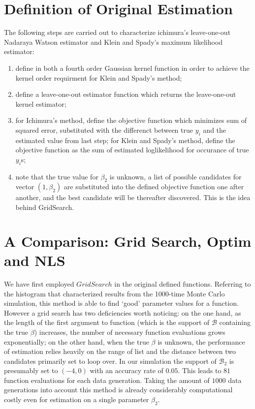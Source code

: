 \documentclass[a4paper]{article}
\begin{document}
\section{Definition of Original Estimation} 
The following steps are carried out to characterize ichimura's leave-one-out Nadaraya Watson estimator and Klein and Spady's maximum likelihood estimator:
\begin{enumerate}
\item define in both a fourth order Gaussian kernel function in order to achieve the kernel order requirment for Klein and Spady's method;
\item define a leave-one-out estimator function which returns the leave-one-out kernel estimator;
\item for Ichimura's method, define the objective function which minimizes sum of squared error, substituted with the differenct between true $y_i$ and the estimated value from last step; for Klein and Spady's method, define the objective function as the sum of estimated loglikelihood for occurance of true $y_i$s; 
\item note that the true value for $\beta_2$ is unknown, a list of possible candidates for vector $(1,\beta_2)$ are substituted into the defined objective function one after another, and the best candidate will be thereafter discovered. This is the idea behind GridSearch.
 
\end{enumerate}

\section{A Comparison: Grid Search, Optim and NLS}
We have first employed $Grid Search$ in the original defined functions. Referring to the histogram that characterized results from the 1000-time Monte Carlo simulation, this method is able to find `good' parameter values for a function. However a grid search has two deficiencies worth noticing: on the one hand, as the length of the first argument to function (which is the support of $\mathcal{B}$ containing the true $\beta$) increases, the number of necessary function evaluations grows exponentially; on the other hand, when the true $\beta$ is unknown, the performance of estimation relies heavily on the range of list and the distance between two candidates primarily set to loop over. In our simulation the support of $\mathcal{B}_2$ is presumably set to $(-4,0)$ with an accuracy rate of $0.05$. This leads to $81$ function evaluations for each data generation. Taking the amount of $1000$ data generations into account this method is already considerably computational costly even for estimation on a single parameter $\beta_2$. 
\end{document}
